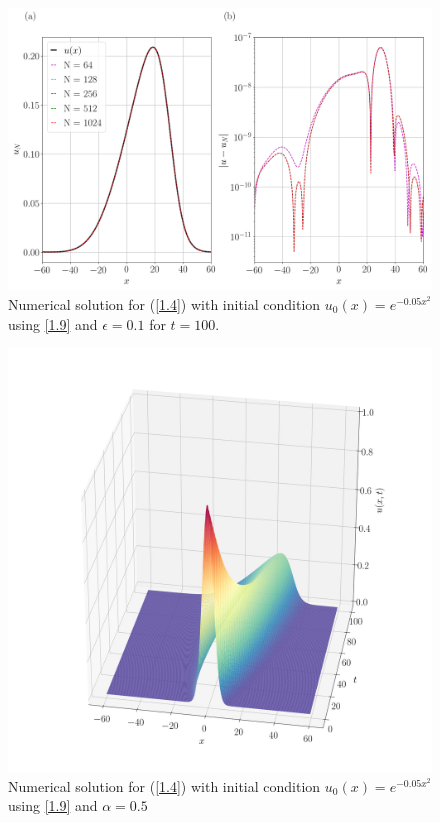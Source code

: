 	\begin{figure}
		\includegraphics[width=\textwidth]{Figures/Galerkin/Graphics/eps=1.0/Numerical_Solution_alpha=1_T=100.png}
		\caption{Numerical solution for (\ref{1.4}) with initial condition $u_0 (x) = e^{- 0.05 x^2}$ using \ref{1.9} and $\epsilon = 0.1$ for $t = 100$.}
		\label{Exact_Solution}
	\end{figure}
	\begin{figure}
		\includegraphics[width=\textwidth]{Figures/Galerkin/Graphics/eps=0.5/Numerical_Solution_alpha=05.png}
		\caption{Numerical solution for (\ref{1.4}) with initial condition $u_0 (x) = e^{- 0.05 x^2}$ using \ref{1.9} and $\alpha = 0.5$}
		\label{Exact_Solution}
	\end{figure}
